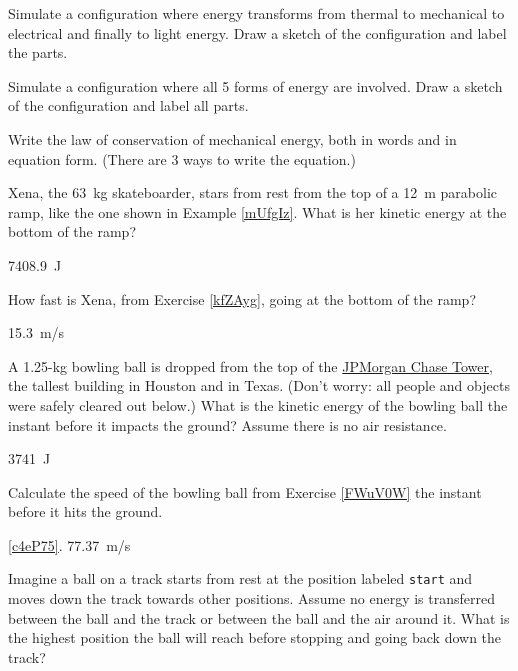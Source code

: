 \documentclass[]{exam}
\begin{document}
\begin{questions}
\question
Simulate a configuration where energy transforms from thermal to mechanical to electrical and finally to light energy. Draw a sketch of the configuration and label the parts.


\question \label{IPOKOY}
Simulate a configuration where all 5 forms of energy are involved. Draw a sketch of the configuration and label all parts.

\question
Write the law of conservation of mechanical energy, both in words and in equation form. (There are 3 ways to write the equation.)


\question \label{kfZAyg}
Xena, the \SI{63}{kg} skateboarder, stars from rest from the top of a \SI{12}{m} parabolic ramp, like the one shown in Example \ref{mUfgIz}. What is her kinetic energy at the bottom of the ramp?

\begin{solution}
\SI{7408.9}{J}
\end{solution}


\question \label{5Nd1zt}
How fast is Xena, from Exercise \ref{kfZAyg}, going at the bottom of the ramp?

\begin{solution}
\SI{15.3}{m/s}
\end{solution}


\question \label{FWuV0W}
A 1.25-kg bowling ball is dropped from the top of the \href{https://en.wikipedia.org/wiki/JPMorgan_Chase_Tower_(Houston)}{JPMorgan Chase Tower}, the tallest building in Houston and in Texas. (Don't worry: all people and objects were safely cleared out below.) What is the kinetic energy of the bowling ball the instant before it impacts the ground? Assume there is no air resistance.

\begin{solution}
\SI{3741}{J}
\end{solution}

\question \label{c4eP75}
Calculate the speed of the bowling ball from Exercise \ref{FWuV0W} the instant before it hits the ground.

\begin{solution}
\ref{c4eP75}. \SI{77.37}{m/s}
\end{solution}

\question
Imagine a ball on a track starts from rest at the position labeled \texttt{start} and moves down the track towards other positions. Assume no energy is transferred between the ball and the track or between the ball and the air around it. What is the highest position the ball will reach before stopping and going back down the track? 


\end{questions}
\end{document}
